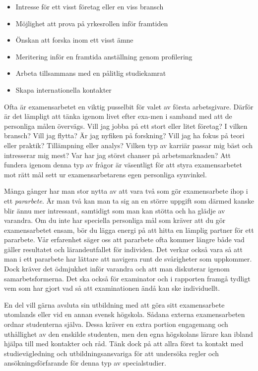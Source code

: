 \begin{itemize}
\item
  Intresse för ett visst företag eller en viss bransch
\item
  Möjlighet att prova på yrkesrollen inför framtiden
\item
  Önskan att forska inom ett visst ämne
\item
  Meritering inför en framtida anställning genom profilering
\item
  Arbeta tillsammans med en pålitlig studiekamrat
\item
  Skapa internationella kontakter
\end{itemize}

Ofta är examensarbetet en viktig pusselbit för valet av första
arbetsgivare. Därför är det lämpligt att tänka igenom livet efter
exa-men i samband med att de personliga målen övervägs. Vill jag jobba
på ett stort eller litet företag? I vilken bransch? Vill jag flytta? Är
jag nyfiken på forskning? Vill jag ha fokus på teori eller praktik?
Tillämpning eller analys? Vilken typ av karriär passar mig bäst och
intresserar mig mest? Var har jag störst chanser på arbetsmarknaden? Att
fundera igenom denna typ av frågor är väsentligt för att styra
examensarbetet mot rätt mål sett ur examensarbetarens egen personliga
synvinkel.

Många gånger har man stor nytta av att vara två som gör examensarbete
ihop i ett \emph{pararbete}. Är man två kan man ta sig an en större
uppgift som därmed kanske blir ännu mer intressant, samtidigt som man
kan stötta och ha glädje av varandra. Om du inte har speciella
personliga mål som kräver att du gör examensarbetet ensam, bör du lägga
energi på att hitta en lämplig partner för ett pararbete. Vår erfarenhet
säger oss att pararbete ofta kommer längre både vad gäller resultatet
och lärandeutfallet för individen. Det verkar också vara så att man i
ett pararbete har lättare att navigera runt de svårigheter som
uppkommer. Dock kräver det ödmjukhet inför varandra och att man
diskuterar igenom samarbetsformerna. Det ska också för examinator och i
rapporten framgå tydligt vem som har gjort vad så att examinationen ändå
kan ske individuellt.

En del vill gärna avsluta sin utbildning med att göra sitt examensarbete
utomlands eller vid en annan svensk högskola. Sådana externa
examensarbeten ordnar studenterna själva. Dessa kräver en extra portion
engagemang och uthållighet av den enskilde studenten, men den egna
högskolans lärare kan ibland hjälpa till med kontakter och råd. Tänk
dock på att allra först ta kontakt med studievägledning och
utbildningsansvariga för att undersöka regler och ansökningsförfarande
för denna typ av specialstudier.

